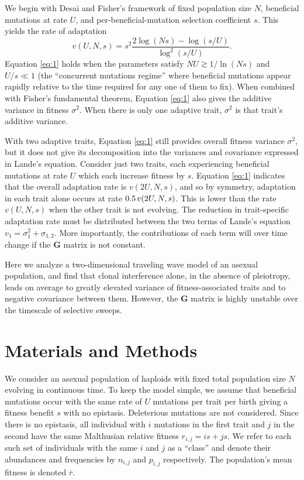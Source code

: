 \documentclass[9pt,twocolumn,twoside]{gsajnl}
\newcommand{\G}{\textbf{G }}
\begin{document}
We begin with Desai and Fisher's \citep{desai2007beneficial} framework of fixed population size $N$, beneficial mutations at rate $U$, and per-beneficial-mutation selection coefficient $s$. This yields the rate of adaptation \citep[Equation 41]{desai2007beneficial}
\begin{equation}\label{eq:1}
v(U,N,s) = s^2\frac{2\log(N s)-\log(s/U)}{\log^2(s/U)}.
\end{equation}
Equation \ref{eq:1} holds when the parameters satisfy $NU \gtrsim 1/\ln(Ns)$ and $U/s \ll 1$ (the ``concurrent mutations regime''  where beneficial mutations appear rapidly relative to the time required for any one of them to fix). When combined with Fisher's fundamental theorem, Equation \eqref{eq:1} also gives the additive variance in fitness $\sigma^2$. When there is only one adaptive trait, $\sigma^2$ is that trait's additive variance. \par

With two adaptive traits, Equation \eqref{eq:1} still provides overall fitness variance $\sigma^2$, but it does not give its decomposition into the variances and covariance expressed in Lande's equation. Consider just two traits, each experiencing beneficial mutations at rate $U$ which each increase fitness by $s$. Equation \ref{eq:1} indicates that the overall adaptation rate is $v(2U,N,s)$, and so by symmetry, adaptation in each trait alone occurs at rate $0.5 \hspace{.02 in} v(2U,N,s)$. This is lower than the rate $v(U,N,s)$ when the other trait is not evolving. The reduction in trait-specific adaptation rate must be distributed between the two terms of Lande's equation $v_1 =\sigma_1^2 +\sigma_{1,2}$. More importantly, the contributions of each term will over time change if the \G matrix is not constant.\par

Here we analyze a two-dimensional traveling wave model of an asexual population, and find that clonal interference alone, in the absence of pleiotropy, leads on average to greatly elevated variance of fitness-associated traits and to negative covariance between them.  However, the \G matrix is highly unstable over the timescale of selective sweeps.\par

\section{Materials and Methods}
\label{sec:materials:methods}
We consider an asexual population of haploids with fixed total population size $N$ evolving in continuous time. To keep the model simple, we assume that beneficial mutations occur with the same rate of $U$ mutations per trait per birth giving a fitness benefit $s$ with no epistasis. Deleterious mutations are not considered. Since there is no epistasis, all individual with $i$ mutations in the first trait and $j$ in the second have the same Malthusian relative fitness $r_{i,j}= i s+j s$. We refer to each such set of individuals with the same $i$ and $j$ as a ``class'' and denote their abundances and frequencies by $n_{i,j}$ and $p_{i,j}$ respectively. The population's mean fitness is denoted $\bar{r}$.\par
\end{document}
